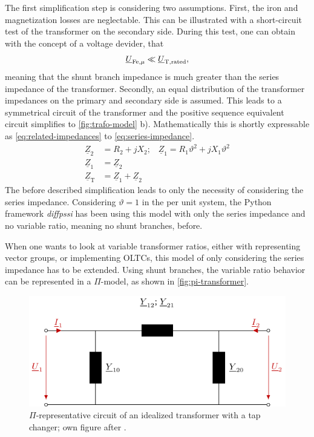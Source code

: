 The first simplification step is considering two assumptions. 
First, the iron and magnetization losses are neglectable. 
This can be illustrated with a short-circuit test of the transformer on the secondary side. 
During this test, one can obtain with the concept of a voltage devider, that
\begin{align}
    \underline{U}_\mathrm{Fe, \mu} \ll \underline{U}_\mathrm{T,rated}, \notag
\end{align}
meaning that the shunt branch impedance is much greater than the series impedance of the transformer. 
Secondly, an equal distribution of the transformer impedances on the primary and secondary side is assumed. 
This leads to a symmetrical circuit of the transformer and the positive sequence equivalent circuit simplifies to \autoref{fig:trafo-model} b). 
Mathematically this is shortly expressable as \autoref{eq:related-impedances} to \autoref{eq:series-impedance}. \autocite{machowski_2020,kundur_2022,milano_2010}
\begin{align}
    \underline{Z}_2 &= R_2 + jX_2\text{;}\quad\underline{Z}_1 = R_1 \vartheta^2 + jX_1 \vartheta^2 \label{eq:related-impedances} \\
    \underline{Z}_1 &= \underline{Z}_2 \label{eq:trafo-symmetrical} \\
    \underline{Z}_\mathrm{T} &= \underline{Z}_1 + \underline{Z}_2 \label{eq:series-impedance}
\end{align}
The before described simplification leads to only the necessity of considering the series impedance. 
Considering $\vartheta=1$ in the per unit system, the Python framework \textit{diffpssi} has been using this model with only the series impedance and no variable ratio, meaning no shunt branches, before.

When one wants to look at variable transformer ratios, either with representing vector groups, or implementing \acfp{OLTC}, this model of only considering the series impedance has to be extended. 
Using shunt branches, the variable ratio behavior can be represented in a $\Pi$-model, as shown in \autoref{fig:pi-transformer}. \autocite{machowski_2020,kundur_2022,milano_2010}

\begin{figure}%
    \centering
    \includegraphics[width=.7\textwidth]{tikz_graphics/images/transformer_pi.pdf}
    \caption[$\Pi$-representative circuit of an idealized transformer with a tap changer]{$\Pi$-representative circuit of an idealized transformer with a tap changer; own figure after \autocite{milano_2010,burlakin_2024}.}
    \label{fig:pi-transformer}
\end{figure}

